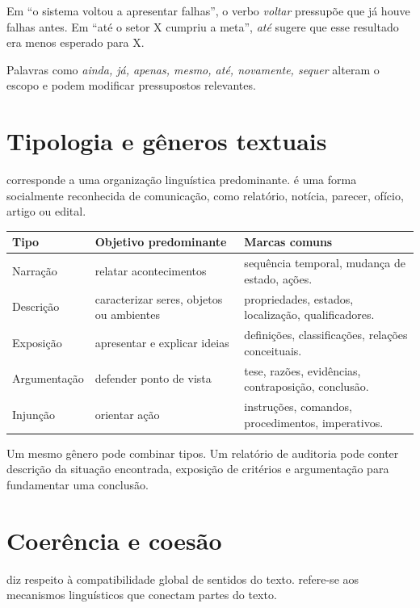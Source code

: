 Em ``o sistema voltou a apresentar falhas'', o verbo \emph{voltar} pressupõe que já houve falhas antes. Em ``até o setor X cumpriu a meta'', \emph{até} sugere que esse resultado era menos esperado para X.

Palavras como \emph{ainda, já, apenas, mesmo, até, novamente, sequer} alteram o escopo e podem modificar pressupostos relevantes.

\section{Tipologia e gêneros textuais}

 corresponde a uma organização linguística predominante.  é uma forma socialmente reconhecida de comunicação, como relatório, notícia, parecer, ofício, artigo ou edital.

\begin{table}[ht]
\centering
\small
\begin{tabularx}{\textwidth}{l X X}
\toprule
Tipo & Objetivo predominante & Marcas comuns \\
\midrule
Narração & relatar acontecimentos & sequência temporal, mudança de estado, ações. \\
Descrição & caracterizar seres, objetos ou ambientes & propriedades, estados, localização, qualificadores. \\
Exposição & apresentar e explicar ideias & definições, classificações, relações conceituais. \\
Argumentação & defender ponto de vista & tese, razões, evidências, contraposição, conclusão. \\
Injunção & orientar ação & instruções, comandos, procedimentos, imperativos. \\
\bottomrule
\end{tabularx}
\end{table}

Um mesmo gênero pode combinar tipos. Um relatório de auditoria pode conter descrição da situação encontrada, exposição de critérios e argumentação para fundamentar uma conclusão.

\section{Coerência e coesão}

 diz respeito à compatibilidade global de sentidos do texto.  refere-se aos mecanismos linguísticos que conectam partes do texto.

